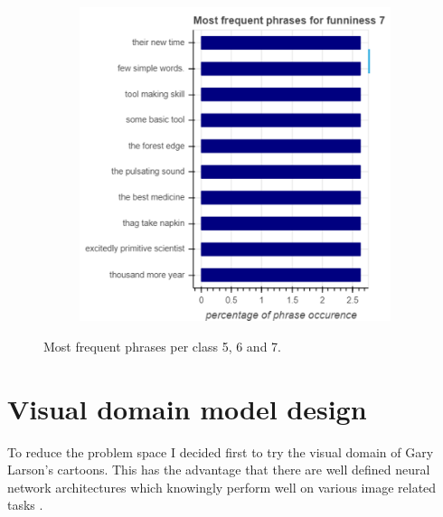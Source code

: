 \documentclass[draft,final,oneside]{vutinfth} %
\begin{document}
\begin{figure}
\begin{subfigure}[b]{0.45\textwidth}
\centering
\includegraphics[width=1.0\textwidth]{graphics/phrases/funniness_7}
\end{subfigure}

\caption{Most frequent phrases per class 5, 6 and 7.}
\label{fig:phraseocc2}

\end{figure}

\fi

\pagebreak

\section{Visual domain model design}

To reduce the problem space I decided first to try the visual domain of Gary Larson's cartoons. This has the advantage that there are well defined neural network architectures which knowingly perform well on various image related tasks \cite{resnet}\cite{alexnet}.
\end{document}
